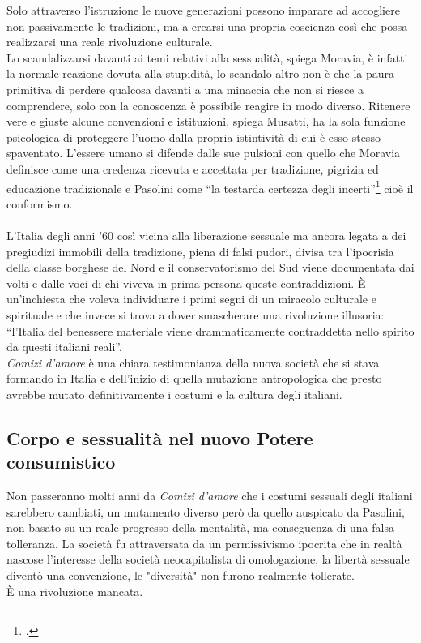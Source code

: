 Solo attraverso l'istruzione le nuove generazioni possono imparare ad accogliere non passivamente le tradizioni, ma a crearsi una propria coscienza così che possa realizzarsi una reale rivoluzione culturale.
\\Lo scandalizzarsi davanti ai temi relativi alla sessualità, spiega Moravia, è infatti la normale reazione dovuta alla stupidità, lo scandalo altro non è che la paura primitiva di perdere qualcosa davanti a una minaccia che non si riesce a comprendere, solo con la conoscenza è possibile reagire in modo diverso.
Ritenere vere e giuste alcune convenzioni e istituzioni, spiega Musatti, ha la sola funzione psicologica di proteggere l'uomo dalla propria istintività di cui è esso stesso spaventato.
L'essere umano si difende dalle sue pulsioni con quello che Moravia definisce come una credenza ricevuta e accettata per tradizione, pigrizia ed educazione tradizionale e Pasolini come \enquote{la testarda certezza degli incerti}\footcite{Comizi} cioè il conformismo.

\paragraph{}L'Italia degli anni '60 così vicina alla liberazione sessuale ma ancora legata a dei pregiudizi immobili della tradizione, piena di falsi pudori, divisa tra l'ipocrisia della classe borghese del Nord e il conservatorismo del Sud viene documentata dai volti e dalle voci di chi viveva in prima persona queste contraddizioni.
È un'inchiesta che voleva individuare i primi segni di un miracolo culturale e spirituale e che invece si trova a dover smascherare una rivoluzione illusoria: \enquote{l'Italia del benessere materiale viene drammaticamente contraddetta nello spirito da questi italiani reali}.
\\\textit{Comizi d'amore} è una chiara testimonianza della nuova società che si stava formando in Italia e dell'inizio di quella mutazione antropologica che presto avrebbe mutato definitivamente i costumi e la cultura degli italiani.



\subsection{Corpo e sessualità nel nuovo Potere consumistico}
Non passeranno molti anni da \textit{Comizi d'amore} che i costumi sessuali degli italiani sarebbero cambiati, un mutamento diverso però da quello auspicato da Pasolini, non basato su un reale progresso della mentalità, ma conseguenza di una falsa tolleranza.
La società fu attraversata da un permissivismo ipocrita che in realtà nascose l'interesse della società neocapitalista di omologazione, la libertà sessuale diventò una convenzione, le "diversità" non furono realmente tollerate.
\\È una rivoluzione mancata.

